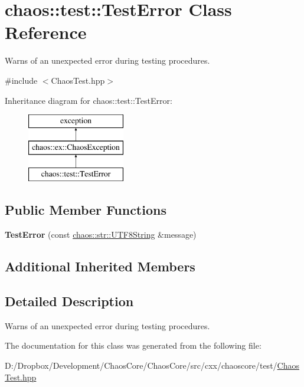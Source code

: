 \hypertarget{classchaos_1_1test_1_1_test_error}{}\section{chaos\+:\+:test\+:\+:Test\+Error Class Reference}
\label{classchaos_1_1test_1_1_test_error}


Warns of an unexpected error during testing procedures.  




{\ttfamily \#include $<$Chaos\+Test.\+hpp$>$}

Inheritance diagram for chaos\+:\+:test\+:\+:Test\+Error\+:\begin{figure}[H]
\begin{center}
\leavevmode
\includegraphics[height=3.000000cm]{classchaos_1_1test_1_1_test_error}
\end{center}
\end{figure}
\subsection*{Public Member Functions}
\begin{DoxyCompactItemize}
\item 
\hypertarget{classchaos_1_1test_1_1_test_error_aea55ce1371395d0790bf064888de8ee3}{}{\bfseries Test\+Error} (const \hyperlink{classchaos_1_1str_1_1_u_t_f8_string}{chaos\+::str\+::\+U\+T\+F8\+String} \&message)\label{classchaos_1_1test_1_1_test_error_aea55ce1371395d0790bf064888de8ee3}

\end{DoxyCompactItemize}
\subsection*{Additional Inherited Members}


\subsection{Detailed Description}
Warns of an unexpected error during testing procedures. 

The documentation for this class was generated from the following file\+:\begin{DoxyCompactItemize}
\item 
D\+:/\+Dropbox/\+Development/\+Chaos\+Core/\+Chaos\+Core/src/cxx/chaoscore/test/\hyperlink{_chaos_test_8hpp}{Chaos\+Test.\+hpp}\end{DoxyCompactItemize}
